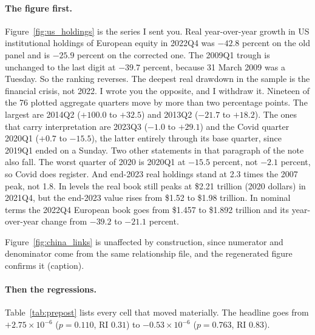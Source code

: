 \documentclass[11pt]{article}
\begin{document}
\paragraph{The figure first.} Figure~\ref{fig:us_holdings} is the series I sent
you. Real year-over-year growth in US institutional holdings of European equity
in 2022Q4 was $-42.8$ percent on the old panel and is $-25.9$ percent on the
corrected one. The 2009Q1 trough is unchanged to the last digit at $-39.7$
percent, because
31 March 2009 was a Tuesday. So the ranking reverses. The deepest real
drawdown in the sample is the financial crisis, not 2022. I wrote you the
opposite, and I withdraw it. Nineteen of the 76 plotted aggregate quarters move
by more than two percentage points. The largest are 2014Q2 ($+100.0$ to
$+32.5$) and 2013Q2 ($-21.7$ to $+18.2$). The ones that carry interpretation
are 2023Q3 ($-1.0$ to $+29.1$) and the Covid quarter 2020Q1 ($+0.7$ to
$-15.5$), the latter entirely through its base quarter, since 2019Q1 ended on
a Sunday. Two other statements in that paragraph of the note also fall. The
worst quarter of 2020 is 2020Q1 at $-15.5$ percent, not $-2.1$ percent, so
Covid does register. And end-2023 real holdings stand at 2.3 times the 2007
peak, not 1.8. In levels
the real book still peaks at \$2.21 trillion (2020 dollars) in 2021Q4, but the
end-2023 value rises from \$1.52 to \$1.98 trillion. In nominal terms the
2022Q4 European book goes from \$1.457 to \$1.892 trillion and its
year-over-year change from $-39.2$ to $-21.1$ percent.

Figure~\ref{fig:china_links} is unaffected by construction, since numerator and
denominator come from the same relationship file, and the regenerated figure
confirms it (caption).

\paragraph{Then the regressions.} Table~\ref{tab:prepost} lists every cell that
moved materially. The headline goes from $+2.75 \times 10^{-6}$ ($p = 0.110$,
RI $0.31$) to $-0.53 \times 10^{-6}$ ($p = 0.763$, RI $0.83$).
\end{document}
